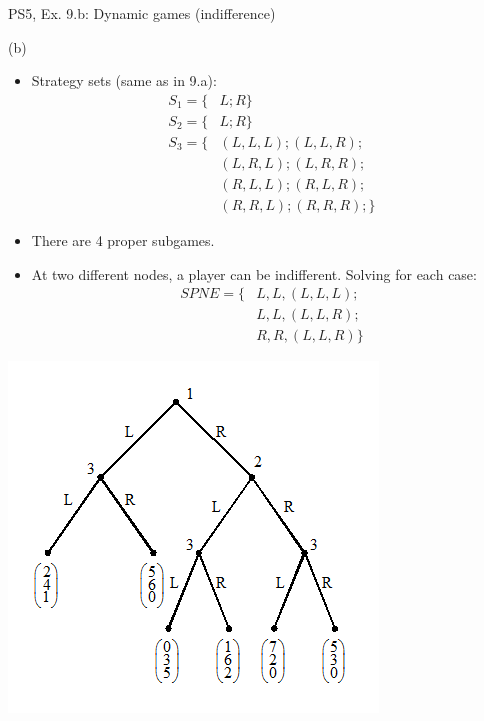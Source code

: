\begin{frame}{PS5, Ex. 9.b: Dynamic games (indifference)}
  \begin{multicols}{2}
    (b)
    \begin{itemize}
      \item Strategy sets (same as in 9.a):
      \begin{align*}
        S_1=\{&L;R\}\\
        S_2=\{&L;R\}\\
        S_3=\{&(L,L,L);(L,L,R);\\
              &(L,R,L);(L,R,R);\\
              &(R,L,L);(R,L,R);\\
              &(R,R,L);(R,R,R);\}
      \end{align*}
      \item There are 4 proper subgames.
      \item At two different nodes, a player can be indifferent. Solving for each case:
      \begin{align*}
        SPNE=\{ &L,L,(L,L,L);\\
                &L,L,(L,L,R);\\
                &R,R,(L,L,R)\}
      \end{align*}
    \end{itemize}
    \vfill\null \columnbreak
    \includegraphics[width=1.2\columnwidth]{figures/Set_5_figure_2}
    \vfill\null
  \end{multicols}
\end{frame}




